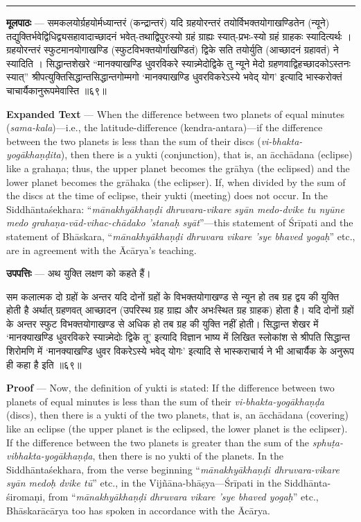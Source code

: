 \documentclass[11pt,a4paper]{article}
\newcommand{\skt}[1]{{\devanagarifont\color{sktcolor} #1}}
\newenvironment{bilingual}{%
  \par\noindent
  \begin{minipage}[t]{0.47\textwidth}%
}{%
  \par\end{minipage}%
}
\newcommand{\rightcol}{%
  \par\end{minipage}%
  \hfill
  \begin{minipage}[t]{0.47\textwidth}%
}
\begin{document}
\medskip
\noindent\rule{\textwidth}{0.4pt}

\begin{bilingual}
\textbf{मूलपाठः} --- \skt{समकलयोर्ग्रहयोर्मध्यान्तरं} (कन्द्रान्तरं) यदि ग्रहयोरन्तरं तयोर्विभक्तयोगाखण्डितेन (न्यूने) तद्युक्तिर्भवेद्विधिद्व्यसहावादाच्छादनं भवेत्-तथाद्विपुरःस्यो ग्रहं ग्राह्यः स्यात्-प्रभः-स्यो ग्रहं ग्राहकः स्यादित्यर्थः । ग्रहयोरन्तरं स्फुटमानयोगाखण्डि (स्फुटविभक्तयोर्गाखण्डितं) द्विके सति तयोर्युति (आच्छादनं ग्रहावतं) ने स्यादिति । सिद्धान्तशेखरे ``मानक्याखण्डि धुवरविकरे स्यान्न्मेदोद्विके तु न्यूने मेदो ग्रहणवाद्विहच्छादकोऽस्तनः स्यात्'' श्रीपत्युक्तिसिद्धान्तसिद्धान्तगोम्मगो `मानक्याखण्डि धुवरविकरेऽस्ये भवेद् योग' इत्यादि भास्करोक्तं चाचार्यैकानुरूपमेवास्ति ॥६९॥
\rightcol
\textbf{Expanded Text} --- When the difference between two planets of equal minutes (\textit{sama-kala})---i.e., the latitude-difference (kendra-antara)---if the difference between the two planets is less than the sum of their discs (\textit{vi-bhakta-yogākhaṇḍita}), then there is a yukti (conjunction), that is, an ācchādana (eclipse) like a grahaṇa; thus, the upper planet becomes the grāhya (the eclipsed) and the lower planet becomes the grāhaka (the eclipser). If, when divided by the sum of the discs at the time of eclipse, their yukti (meeting) does not occur. In the Siddhāntaśekhara: ``\textit{mānakhyākhaṇḍi dhruvara-vikare syān medo-dvike tu nyūne medo grahaṇa-vād-vihac-chādako 'stanaḥ syāt}''---this statement of Śrīpati and the statement of Bhāskara, ``\textit{mānakhyākhaṇḍi dhruvara vikare 'sye bhaved yogaḥ}'' etc., are in agreement with the Ācārya's teaching.
\end{bilingual}

\medskip

\begin{bilingual}
\textbf{उपपत्तिः} --- अथ युक्ति लक्षण को कहते हैं।

\skt{सम कलात्मक दो ग्रहों के अन्तर यदि दोनों ग्रहों के विभक्तयोगाखण्ड से न्यून हो तब ग्रह द्वय की युक्ति होती है अर्थात् ग्रहणवत् आच्छादन (उपरिस्थ ग्रह ग्राह्य और अभःस्थित ग्रह ग्राहक) होता है। यदि दोनों ग्रहों के अन्तर स्फुट विभक्तयोगाखण्ड से अधिक हो तब ग्रह की युक्ति नहीं होती। सिद्धान्त शेखर में `मानक्याखण्डि धुवरविकरे स्यान्न्मेदोः द्विके तू' इत्यादि विज्ञान भाष्य में लिखित स्लोकांश से श्रीपति सिद्धान्त शिरोमणि में `मानक्याखण्डि धुवर विकरेऽस्ये भवेद् योगः' इत्यादि से भास्कराचार्य ने भी आचार्यैक के अनुरूप ही कहा है इति ॥६९॥}
\rightcol
\textbf{Proof} --- Now, the definition of yukti is stated: If the difference between two planets of equal minutes is less than the sum of their \textit{vi-bhakta-yogākhaṇḍa} (discs), then there is a yukti of the two planets, that is, an ācchādana (covering) like an eclipse (the upper planet is the eclipsed, the lower planet is the eclipser). If the difference between the two planets is greater than the sum of the \textit{sphuṭa-vibhakta-yogākhaṇḍa}, then there is no yukti of the planets. In the Siddhāntaśekhara, from the verse beginning ``\textit{mānakhyākhaṇḍi dhruvara-vikare syān medoḥ dvike tū}'' etc., in the Vijñāna-bhāṣya---Śrīpati in the Siddhānta-śiromaṇi, from ``\textit{mānakhyākhaṇḍi dhruvara vikare 'sye bhaved yogaḥ}'' etc., Bhāskarācārya too has spoken in accordance with the Ācārya.
\end{bilingual}
\end{document}
